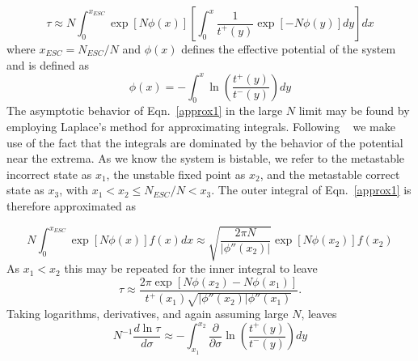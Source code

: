 \documentclass[3p,number,sort&compress,times]{elsarticle}
\begin{document}
\begin{equation}
\tau \approx N \int_{0}^{x_{ESC}} \exp\left[N\phi(x)\right] \left[ \int_{0}^{x} \frac{1}{t^+(y)}\exp\left[-N\phi(y)\right] dy \right] dx
\label{approx1}
\end{equation}
where $x_{ESC} = N_{ESC}/N$ and $\phi(x)$ defines the effective potential of the system and is defined as 
\begin{equation}
\phi(x) =  -\int_{0}^{x} \ln\left(\frac{t^+(y)}{t^-(y)}\right) dy
\label{potential}
\end{equation}
The asymptotic behavior of Eqn.~\ref{approx1} in the large $N$ limit may be found by employing Laplace's method for approximating integrals. Following ~\cite{vankampen} we make use of the fact that the integrals are dominated by the behavior of the potential near the extrema. As we know the system is bistable, we refer to the metastable incorrect state as $x_1$, the unstable fixed point as $x_2$, and the metastable correct state as $x_3$, with $x_1<x_2\le N_{ESC}/N < x_3$. The outer integral of Eqn.~\ref{approx1} is therefore approximated as

\begin{equation}
N \int_{0}^{x_{ESC}} \exp\left[N\phi(x)\right] f(x) dx \approx \sqrt{\frac{2\pi N}{\vert \phi''(x_2) \vert}}  \exp\left[N\phi(x_2)\right] f(x_2) 
\label{laplace_out}
\end{equation}
As $x_1<x_2$ this may be repeated for the inner integral to leave
\begin{equation}
\tau \approx  \frac{2\pi \exp\left[N \phi(x_2)-N \phi(x_1) \right] }{t^+(x_1)\sqrt{\vert \phi''(x_2) \vert \phi''(x_1)}}.
\label{laplace_approx}
\end{equation}
Taking logarithms, derivatives, and again assuming large $N$, leaves
\begin{equation}
N^{-1}  \frac{d \ln \tau}{d \sigma} \approx -\int_{x_1}^{x_2} \frac{\partial}{\partial \sigma}\ln\left(\frac{t^+(y)}{t^-(y)}\right) dy
\label{laplace_approx}
\end{equation}
\end{document}
